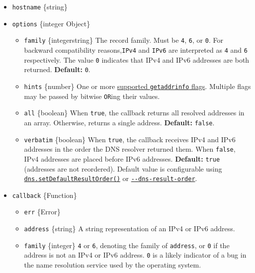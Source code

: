 \begin{itemize}
\tightlist
\item
  \texttt{hostname} \{string\}
\item
  \texttt{options} \{integer \textbar{} Object\}

  \begin{itemize}
  \tightlist
  \item
    \texttt{family} \{integer\textbar string\} The record family. Must
    be \texttt{4}, \texttt{6}, or \texttt{0}. For backward compatibility
    reasons,\texttt{\textquotesingle{}IPv4\textquotesingle{}} and
    \texttt{\textquotesingle{}IPv6\textquotesingle{}} are interpreted as
    \texttt{4} and \texttt{6} respectively. The value \texttt{0}
    indicates that IPv4 and IPv6 addresses are both returned.
    \textbf{Default:} \texttt{0}.
  \item
    \texttt{hints} \{number\} One or more
    \hyperref[supported-getaddrinfo-flags]{supported
    \texttt{getaddrinfo} flags}. Multiple flags may be passed by bitwise
    \texttt{OR}ing their values.
  \item
    \texttt{all} \{boolean\} When \texttt{true}, the callback returns
    all resolved addresses in an array. Otherwise, returns a single
    address. \textbf{Default:} \texttt{false}.
  \item
    \texttt{verbatim} \{boolean\} When \texttt{true}, the callback
    receives IPv4 and IPv6 addresses in the order the DNS resolver
    returned them. When \texttt{false}, IPv4 addresses are placed before
    IPv6 addresses. \textbf{Default:} \texttt{true} (addresses are not
    reordered). Default value is configurable using
    \hyperref[dnssetdefaultresultorderorder]{\texttt{dns.setDefaultResultOrder()}}
    or
    \href{cli.md\#--dns-result-orderorder}{\texttt{-\/-dns-result-order}}.
  \end{itemize}
\item
  \texttt{callback} \{Function\}

  \begin{itemize}
  \tightlist
  \item
    \texttt{err} \{Error\}
  \item
    \texttt{address} \{string\} A string representation of an IPv4 or
    IPv6 address.
  \item
    \texttt{family} \{integer\} \texttt{4} or \texttt{6}, denoting the
    family of \texttt{address}, or \texttt{0} if the address is not an
    IPv4 or IPv6 address. \texttt{0} is a likely indicator of a bug in
    the name resolution service used by the operating system.
  \end{itemize}
\end{itemize}

